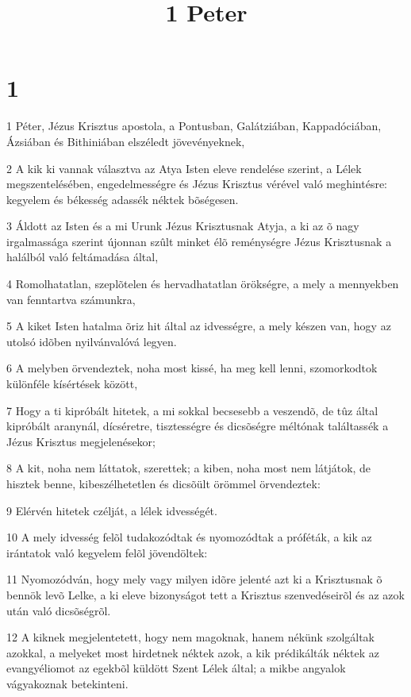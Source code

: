 

\title{1 Peter}


\chapter{1}

\par 1 Péter, Jézus Krisztus apostola, a Pontusban, Galátziában, Kappadóciában, Ázsiában és Bithiniában elszéledt jövevényeknek,
\par 2 A kik ki vannak választva az Atya Isten eleve rendelése szerint, a Lélek megszentelésében, engedelmességre és Jézus Krisztus vérével való meghintésre: kegyelem és békesség adassék néktek bõségesen.
\par 3 Áldott az Isten és a mi Urunk Jézus Krisztusnak Atyja, a ki az õ nagy irgalmassága szerint újonnan szûlt minket élõ reménységre Jézus Krisztusnak a halálból való feltámadása által,
\par 4 Romolhatatlan, szeplõtelen és hervadhatatlan örökségre, a mely a mennyekben van fenntartva számunkra,
\par 5 A kiket Isten hatalma õriz hit által az idvességre, a mely készen van, hogy az utolsó idõben nyilvánvalóvá legyen.
\par 6 A melyben örvendeztek, noha most kissé, ha meg kell lenni, szomorkodtok különféle kísértések között,
\par 7 Hogy a ti kipróbált hitetek, a mi sokkal becsesebb a veszendõ, de tûz által kipróbált aranynál, dícséretre, tisztességre és dicsõségre méltónak találtassék a Jézus Krisztus megjelenésekor;
\par 8 A kit, noha nem láttatok, szerettek; a kiben, noha most nem látjátok, de hisztek benne, kibeszélhetetlen és dicsõült örömmel örvendeztek:
\par 9 Elérvén hitetek czélját, a lélek idvességét.
\par 10 A mely idvesség felõl tudakozódtak és nyomozódtak a próféták, a kik az irántatok való kegyelem felõl jövendöltek:
\par 11 Nyomozódván, hogy mely vagy milyen idõre jelenté azt ki a Krisztusnak õ bennök levõ Lelke, a ki eleve bizonyságot tett a Krisztus szenvedéseirõl és az azok után való dicsõségrõl.
\par 12 A kiknek megjelentetett, hogy nem magoknak, hanem nékünk szolgáltak azokkal, a melyeket most hirdetnek néktek azok, a kik prédikálták néktek az evangyéliomot az egekbõl küldött Szent Lélek által; a mikbe angyalok vágyakoznak betekinteni.
